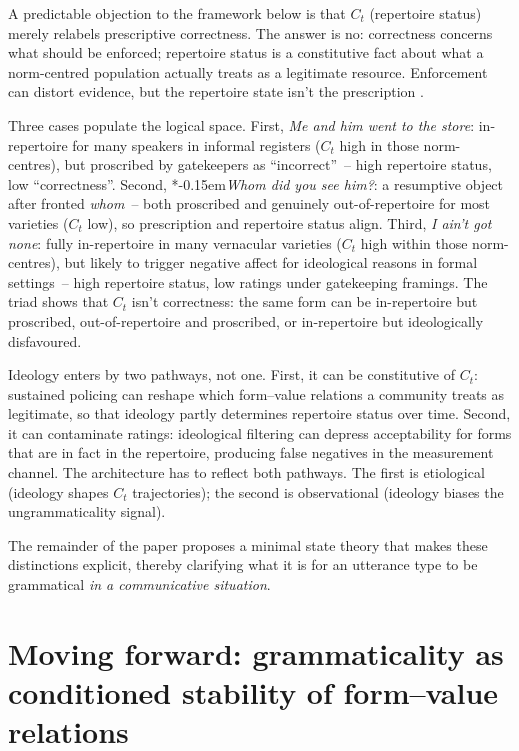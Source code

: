 \documentclass[12pt,letterpaper]{article}
\newcommand{\mention}[1]{\textit{#1}}
\newcommand{\judgesep}{\kern-0.15em}
\newcommand{\ungram}[1]{*\judgesep#1}
\begin{document}
A predictable objection to the framework below is that $C_t$ (repertoire status) merely relabels prescriptive correctness. The answer is no: correctness concerns what should be enforced; repertoire status is a constitutive fact about what a norm-centred population actually treats as a legitimate resource. Enforcement can distort evidence, but the repertoire state isn't the prescription \autocite[for parallel distinctions]{pullum2019-normativity}.

Three cases populate the logical space. First, \mention{Me and him went to the store}: in-repertoire for many speakers in informal registers ($C_t$ high in those norm-centres), but proscribed by gatekeepers as \enquote{incorrect}~-- high repertoire status, low \enquote{correctness}. Second, \ungram{\mention{Whom did you see him?}}: a resumptive object after fronted \mention{whom}~-- both proscribed and genuinely out-of-repertoire for most varieties ($C_t$ low), so prescription and repertoire status align. Third, \mention{I ain't got none}: fully in-repertoire in many vernacular varieties ($C_t$ high within those norm-centres), but likely to trigger negative affect for ideological reasons in formal settings~-- high repertoire status, low ratings under gatekeeping framings. The triad shows that $C_t$ isn't correctness: the same form can be in-repertoire but proscribed, out-of-repertoire and proscribed, or in-repertoire but ideologically disfavoured.

Ideology enters by two pathways, not one. First, it can be constitutive of $C_t$: sustained policing can reshape which form--value relations a community treats as legitimate, so that ideology partly determines repertoire status over time. Second, it can contaminate ratings: ideological filtering can depress acceptability for forms that are in fact in the repertoire, producing false negatives in the measurement channel. The architecture has to reflect both pathways. The first is etiological (ideology shapes $C_t$ trajectories); the second is observational (ideology biases the ungrammaticality signal).

The remainder of the paper proposes a minimal state theory that makes these distinctions explicit, thereby clarifying what it is for an utterance type to be grammatical \emph{in a communicative situation}.

\section[Moving forward: conditioned stability]{Moving forward: grammaticality as conditioned stability of form--value relations}\label{sec:movingforward}
\end{document}

